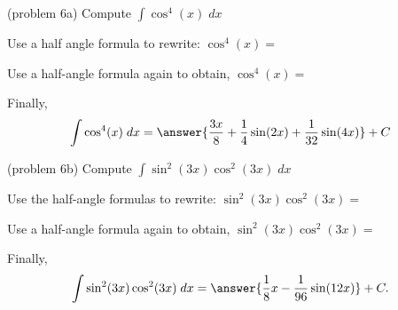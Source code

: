 \documentclass[handout]{ximera}
\begin{document}
\begin{problem}(problem 6a)
Compute $\displaystyle{\int \cos^4(x) \; dx}$


Use a half angle formula to rewrite: $\cos^4(x)=$

\begin{multipleChoice}
\end{multipleChoice}

Use a half-angle formula again to obtain, $\cos^4(x) = $

\begin{multipleChoice}
\end{multipleChoice}

Finally,
\[
\int \cos^4(x) \; dx = \answer{\frac{3x}{8} +\frac14 \sin(2x) + \frac{1}{32}\sin(4x)} + C
\]
\end{problem}



\begin{problem}(problem 6b)
Compute $\displaystyle{\int \sin^2(3x)\cos^2(3x) \; dx}$


Use the half-angle formulas to rewrite: $\sin^2(3x) \cos^2(3x)=$

\begin{multipleChoice}
\end{multipleChoice}

Use a half-angle formula again to obtain, $\sin^2(3x) \cos^2(3x)=$

\begin{multipleChoice}
\end{multipleChoice}

Finally,
\[
\int \sin^2(3x)\cos^2(3x) \; dx = \answer{\frac18 x - \frac{1}{96} \sin(12x)} + C.
\]

\end{problem}


\end{document}

